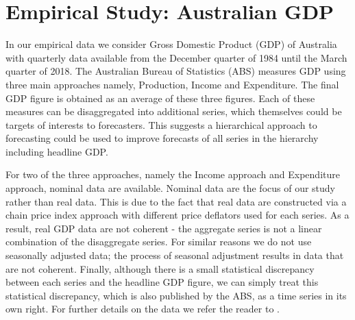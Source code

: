 \documentclass[graybox]{svmult}
\begin{document}


\section{Empirical Study: Australian GDP}\label{sec:data}

In our empirical data we consider Gross Domestic Product (GDP) of Australia with quarterly data available from the December quarter of 1984 until the March quarter of 2018.  The Australian Bureau of Statistics (ABS) measures GDP using three main approaches namely, Production, Income and Expenditure. The final GDP figure is obtained as an average of these three figures.  Each of these measures can be disaggregated into additional series, which themselves could be targets of interests to forecasters.  This suggests a hierarchical approach to forecasting could be used to improve forecasts of all series in the hierarchy including headline GDP.

For two of the three approaches, namely the Income approach and Expenditure approach, nominal data are available. Nominal data are the focus of our study rather than real data.  This is due to the fact that real data are constructed via a chain price index approach with different price deflators used for each series.  As a result, real GDP data are not coherent - the aggregate series is not a linear combination of the disaggregate series.  For similar reasons we do not use seasonally adjusted data; the process of seasonal adjustment results in data that are not coherent.  Finally, although there is a small statistical discrepancy between each series and the headline GDP figure, we can simply treat this statistical discrepancy, which is also published by the ABS, as a time series in its own right.  For further details on the data we refer the reader to \citep{ABS2018}.
\end{document}
